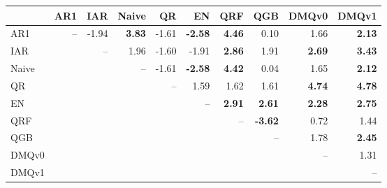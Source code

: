 \begin{tabular}{lrrrrrrrrr}
\toprule
 & AR1 & IAR & Naive & QR & EN & QRF & QGB & DMQv0 & DMQv1 \\
\midrule
AR1 & -- & -1.94 & \textbf{3.83} & -1.61 & \textbf{-2.58} & \textbf{4.46} & 0.10 & 1.66 & \textbf{2.13} \\
IAR &  & -- & 1.96 & -1.60 & -1.91 & \textbf{2.86} & 1.91 & \textbf{2.69} & \textbf{3.43} \\
Naive &  &  & -- & -1.61 & \textbf{-2.58} & \textbf{4.42} & 0.04 & 1.65 & \textbf{2.12} \\
QR &  &  &  & -- & 1.59 & 1.62 & 1.61 & \textbf{4.74} & \textbf{4.78} \\
EN &  &  &  &  & -- & \textbf{2.91} & \textbf{2.61} & \textbf{2.28} & \textbf{2.75} \\
QRF &  &  &  &  &  & -- & \textbf{-3.62} & 0.72 & 1.44 \\
QGB &  &  &  &  &  &  & -- & 1.78 & \textbf{2.45} \\
DMQv0 &  &  &  &  &  &  &  & -- & 1.31 \\
DMQv1 &  &  &  &  &  &  &  &  & -- \\
\bottomrule
\end{tabular}

